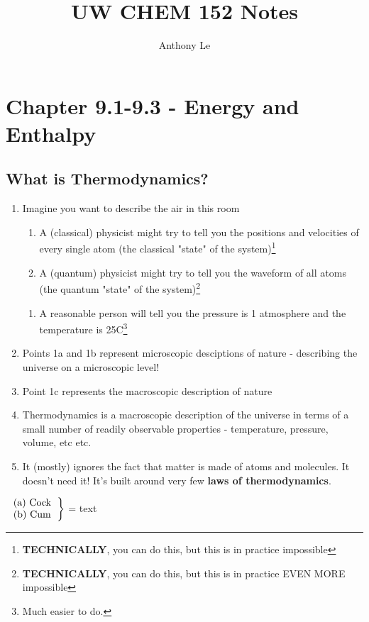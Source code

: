 \documentclass{article}  %
\title{UW CHEM 152 Notes}
\author{Anthony Le}
\begin{document}
\pagestyle{fancy}
\fancyhead{}



\newpage



\newpage



\newpage

\section*{Chapter 9.1-9.3 - Energy and Enthalpy}

\subsection*{What is Thermodynamics?}
\begin{enumerate}
    \item Imagine you want to describe the air in this room
    \begin{enumerate}
        \item A (classical) physicist might try to tell you the positions and velocities of every single atom (the classical "state" of the system)\footnote{\textbf{TECHNICALLY}, you can do this, but this is in practice impossible}
        \item A (quantum) physicist might try to tell you the waveform of all atoms (the quantum "state" of the system)\footnote{\textbf{TECHNICALLY}, you can do this, but this is in practice EVEN MORE impossible}
    \end{enumerate}
    \begin{enumerate}
        \item A reasonable person will tell you the pressure is 1 atmosphere and the temperature is 25C\footnote{Much easier to do.}
    \end{enumerate}
    \item Points 1a and 1b represent microscopic desciptions of nature - describing the universe on a microscopic level!
    \item Point 1c represents the macroscopic description of nature
    \item Thermodynamics is a macroscopic description of the universe in terms of a small number of readily observable properties - temperature, pressure, volume, etc etc.
    \item It (mostly) ignores the fact that matter is made of atoms and molecules. It doesn't need it! It's built around very few \textbf{laws of thermodynamics}. 
\end{enumerate}
$\left.
    \begin{tabular}{ll}
        (a) Cock \\
        (b) Cum
    \end{tabular}
\right\}$  = text
    
\end{document}
